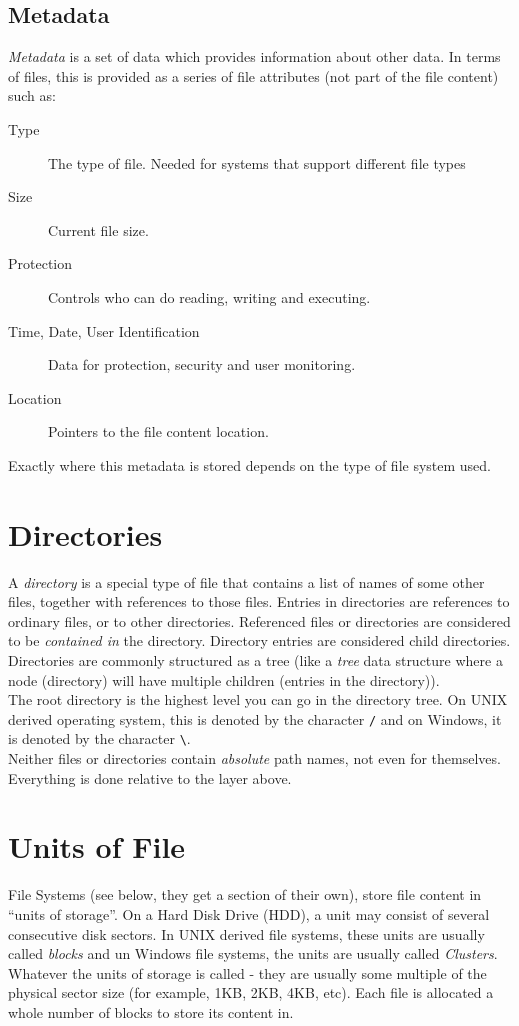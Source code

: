 \subsection{Metadata}
\textit{Metadata} is a set of data which provides information about other data. In terms of files, this is provided as a series of file attributes (not part of the file content) such as:
\begin{description}
    \item[Type] The type of file. Needed for systems that support different file types
    \item[Size] Current file size.
    \item[Protection] Controls who can do reading, writing and executing.
    \item[Time, Date, User Identification] Data for protection, security and user monitoring.
    \item[Location] Pointers to the file content location.
\end{description}

Exactly where this metadata is stored depends on the type of file system used.

\section{Directories}
A \textit{directory} is a special type of file that contains a list of names of some other files, together with references to those files. Entries in directories are references to ordinary files, or to other directories. Referenced files or directories are considered to be \textit{contained in} the directory. Directory entries are considered child directories.\\

Directories are commonly structured as a tree (like a \textit{tree} data structure where a node (directory) will have multiple children (entries in the directory)).\\

The root directory is the highest level you can go in the directory tree. On UNIX derived operating system, this is denoted by the character \verb|/| and on Windows, it is denoted by the character \verb|\|.\\

Neither files or directories contain \textit{absolute} path names, not even for themselves. Everything is done relative to the layer above.

\section{Units of File}
File Systems (see below, they get a section of their own), store file content in ``units of storage''. On a Hard Disk Drive (HDD), a unit may consist of several consecutive disk sectors. In UNIX derived file systems, these units are usually called \textit{blocks} and un Windows file systems, the units are usually called \textit{Clusters}. Whatever the units of storage is called - they are usually some multiple of the physical sector size (for example, 1KB, 2KB, 4KB, etc). Each file is allocated a whole number of blocks to store its content in. 

